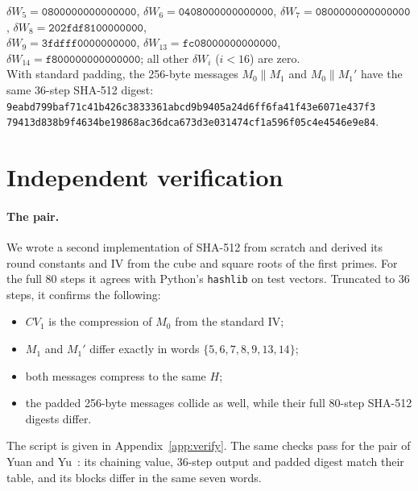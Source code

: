 \documentclass[11pt]{article}
\newcommand{\hx}[1]{\texttt{#1}}
\begin{document}
\begin{table}[t]
\medskip
\footnotesize
$\delta W_5=\hx{0800000000000000}$, $\delta W_6=\hx{0408000000000000}$, $\delta W_7=\hx{0800000000000000}$, $\delta W_8=\hx{202fdf8100000000}$,\\
$\delta W_9=\hx{3fdfff0000000000}$, $\delta W_{13}=\hx{fc08000000000000}$, $\delta W_{14}=\hx{f800000000000000}$; all other $\delta W_i$ ($i<16$) are zero.\\
With standard padding, the 256-byte messages $M_0\|M_1$ and $M_0\|M_1'$ have the same 36-step SHA-512 digest:\\
\hx{9eabd799baf71c41b426c3833361abcd9b9405a24d6ff6fa41f43e6071e437f3}\\
\hx{79413d838b9f4634be19868ac36dca673d3e031474cf1a596f05c4e4546e9e84}.
\end{table}

\section{Independent verification}\label{sec:verify}

\paragraph{The pair.} We wrote a second implementation of SHA-512 from scratch and derived its round constants and IV from the cube and square roots of the first primes. For the full 80 steps it agrees with Python's \texttt{hashlib} on test vectors. Truncated to 36 steps, it confirms the following:
\begin{itemize}
\item $\mathit{CV}_1$ is the compression of $M_0$ from the standard IV;
\item $M_1$ and $M_1'$ differ exactly in words $\{5,6,7,8,9,13,14\}$;
\item both messages compress to the same $H$;
\item the padded 256-byte messages collide as well, while their full 80-step SHA-512 digests differ.
\end{itemize}
The script is given in Appendix~\ref{app:verify}. The same checks pass for the pair of Yuan and Yu~\cite[Table~7]{YY26}: its chaining value, 36-step output and padded digest match their table, and its blocks differ in the same seven words.
\end{document}
